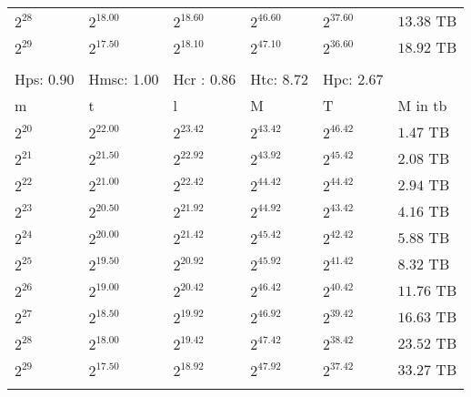 \documentclass{article}
\begin{document}
\begin{tabular}{llllll}
$2^{28}$ & $2^{18.00}$ & $2^{18.60}$ & $2^{46.60}$ & $2^{37.60}$ & $13.38$ TB \\
$2^{29}$ & $2^{17.50}$ & $2^{18.10}$ & $2^{47.10}$ & $2^{36.60}$ & $18.92$ TB \\
 &  &  &  &  &  \\
Hps: 0.90 & Hmsc: 1.00 & Hcr : 0.86 & Htc: 8.72 & Hpc: 2.67 &  \\
m & t & l & M & T & M in tb \\
$2^{20}$ & $2^{22.00}$ & $2^{23.42}$ & $2^{43.42}$ & $2^{46.42}$ & $1.47$ TB \\
$2^{21}$ & $2^{21.50}$ & $2^{22.92}$ & $2^{43.92}$ & $2^{45.42}$ & $2.08$ TB \\
$2^{22}$ & $2^{21.00}$ & $2^{22.42}$ & $2^{44.42}$ & $2^{44.42}$ & $2.94$ TB \\
$2^{23}$ & $2^{20.50}$ & $2^{21.92}$ & $2^{44.92}$ & $2^{43.42}$ & $4.16$ TB \\
$2^{24}$ & $2^{20.00}$ & $2^{21.42}$ & $2^{45.42}$ & $2^{42.42}$ & $5.88$ TB \\
$2^{25}$ & $2^{19.50}$ & $2^{20.92}$ & $2^{45.92}$ & $2^{41.42}$ & $8.32$ TB \\
$2^{26}$ & $2^{19.00}$ & $2^{20.42}$ & $2^{46.42}$ & $2^{40.42}$ & $11.76$ TB \\
$2^{27}$ & $2^{18.50}$ & $2^{19.92}$ & $2^{46.92}$ & $2^{39.42}$ & $16.63$ TB \\
$2^{28}$ & $2^{18.00}$ & $2^{19.42}$ & $2^{47.42}$ & $2^{38.42}$ & $23.52$ TB \\
$2^{29}$ & $2^{17.50}$ & $2^{18.92}$ & $2^{47.92}$ & $2^{37.42}$ & $33.27$ TB \\
 &  &  &  &  &  \\

\end{tabular}
\newpage
\end{document}
